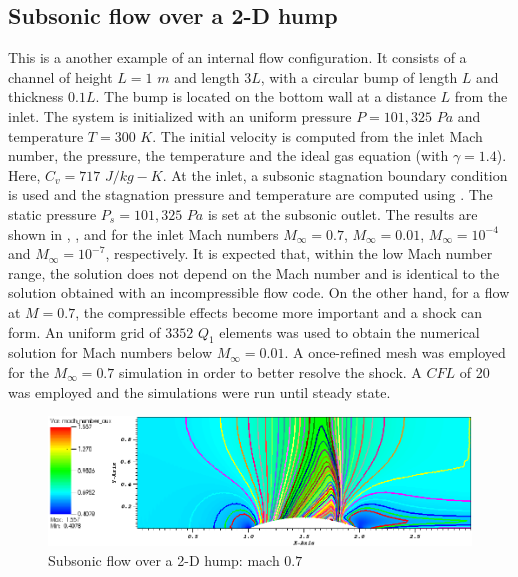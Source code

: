 \subsection{Subsonic flow over a 2-D hump} \label{sec:hump}
This is a another example of an internal flow configuration. It consists of a channel of height $L=1$ $m$ and length $3L$, with a circular bump of length $L$ and thickness $0.1L$. The bump is located on the bottom wall at a distance $L$ from the inlet. The system is initialized with an uniform pressure $P=101,325$ $Pa$ and temperature $T=300$ $K$. The initial velocity is computed from the inlet Mach number, the pressure, the temperature and the ideal gas equation (with  $\gamma=1.4$). Here,  $C_v = 717$ $J/kg-K$. At the inlet, a subsonic stagnation boundary condition is used and the stagnation pressure and temperature are computed using .
The static pressure $P_s = 101,325$ $Pa$ is set at the subsonic outlet. The results are shown in , ,  and  for the inlet Mach numbers $M_{\infty}=0.7$, $M_{\infty}=0.01$, $M_{\infty}=10^{-4}$ and $M_{\infty}=10^{-7}$, respectively. It is expected that, within the low Mach number range, the solution does not depend on the Mach number and is identical to the solution obtained with an incompressible flow code. On the other hand, for a flow at $M=0.7$, the compressible effects become more important and a shock can form. An uniform grid of $3352$ $Q_1$ elements was used to obtain the numerical solution for Mach numbers below $M_{\infty}=0.01$. A once-refined mesh was employed for the $M_{\infty}=0.7$ simulation in order to better resolve the shock. A $CFL$ of 20 was employed and the simulations were run until steady state.
%
        \begin{figure}[H]
                \centering
                \includegraphics[width=\textwidth]{figures/Hump2D_mach_0p7.png}
                \caption{Subsonic flow over a 2-D hump: mach $0.7$}
                \label{fig:2d_hump_mach_0p7}
        \end{figure}%

